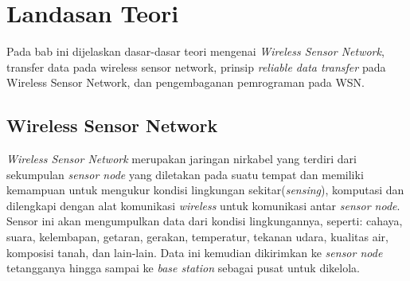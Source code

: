 \chapter{Landasan Teori}
\label{chap:teori}
Pada bab ini dijelaskan dasar-dasar teori mengenai \textit{Wireless Sensor Network}, transfer data pada wireless sensor network, prinsip \textit{reliable data transfer} pada Wireless Sensor Network, dan pengembaganan pemrograman pada WSN.

\section{Wireless Sensor Network}
\label{sec:wsn}
\textit{Wireless Sensor Network} merupakan jaringan nirkabel yang terdiri dari sekumpulan \textit{sensor node} yang diletakan pada suatu tempat dan memiliki kemampuan untuk mengukur kondisi lingkungan sekitar(\textit{sensing}), komputasi dan dilengkapi dengan alat komunikasi \textit{wireless} untuk komunikasi antar \textit{sensor node}. Sensor ini akan mengumpulkan data dari kondisi lingkungannya, seperti: cahaya, suara, kelembapan, getaran, gerakan, temperatur, tekanan udara, kualitas air, komposisi tanah, dan lain-lain. Data ini kemudian dikirimkan ke \textit{sensor node} tetangganya hingga sampai ke \textit{base station} sebagai pusat untuk dikelola.

